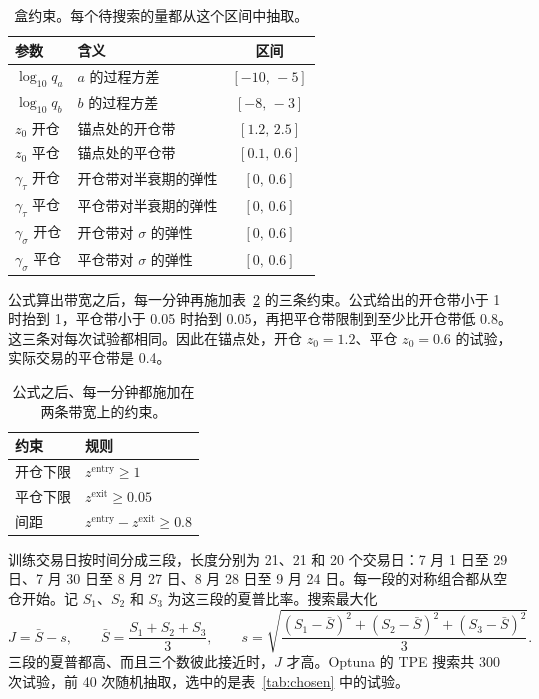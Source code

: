 \documentclass[11pt,fontset=none,scheme=plain]{ctexart}
\begin{document}
\begin{table}[ht]
\centering
\caption{盒约束。每个待搜索的量都从这个区间中抽取。}
\label{tab:search}
\begin{tabular}{llc}
\toprule
参数 & 含义 & 区间 \\
\midrule
$\log_{10} q_a$ & $a$ 的过程方差 & $[-10,\,-5]$ \\
$\log_{10} q_b$ & $b$ 的过程方差 & $[-8,\,-3]$ \\
$z_0$ 开仓 & 锚点处的开仓带 & $[1.2,\,2.5]$ \\
$z_0$ 平仓 & 锚点处的平仓带 & $[0.1,\,0.6]$ \\
$\gamma_\tau$ 开仓 & 开仓带对半衰期的弹性 & $[0,\,0.6]$ \\
$\gamma_\tau$ 平仓 & 平仓带对半衰期的弹性 & $[0,\,0.6]$ \\
$\gamma_\sigma$ 开仓 & 开仓带对 $\sigma$ 的弹性 & $[0,\,0.6]$ \\
$\gamma_\sigma$ 平仓 & 平仓带对 $\sigma$ 的弹性 & $[0,\,0.6]$ \\
\bottomrule
\end{tabular}
\end{table}

公式算出带宽之后，每一分钟再施加表~\ref{tab:bounds} 的三条约束。公式给出的开仓带小于 1 时抬到 1，平仓带小于 0.05 时抬到 0.05，再把平仓带限制到至少比开仓带低 0.8。这三条对每次试验都相同。因此在锚点处，开仓 $z_0 = 1.2$、平仓 $z_0 = 0.6$ 的试验，实际交易的平仓带是 0.4。

\begin{table}[ht]
\centering
\caption{公式之后、每一分钟都施加在两条带宽上的约束。}
\label{tab:bounds}
\begin{tabular}{ll}
\toprule
约束 & 规则 \\
\midrule
开仓下限 & $z^{\mathrm{entry}} \ge 1$ \\
平仓下限 & $z^{\mathrm{exit}} \ge 0.05$ \\
间距 & $z^{\mathrm{entry}} - z^{\mathrm{exit}} \ge 0.8$ \\
\bottomrule
\end{tabular}
\end{table}

训练交易日按时间分成三段，长度分别为 21、21 和 20 个交易日：7 月 1 日至 29 日、7 月 30 日至 8 月 27 日、8 月 28 日至 9 月 24 日。每一段的对称组合都从空仓开始。记 $S_1$、$S_2$ 和 $S_3$ 为这三段的夏普比率。搜索最大化
\begin{equation}
J = \bar S - s,
\qquad
\bar S = \frac{S_1 + S_2 + S_3}{3},
\qquad
s = \sqrt{\frac{(S_1 - \bar S)^2 + (S_2 - \bar S)^2 + (S_3 - \bar S)^2}{3}}.
\end{equation}
三段的夏普都高、而且三个数彼此接近时，$J$ 才高。Optuna 的 TPE 搜索共 300 次试验，前 40 次随机抽取，选中的是表~\ref{tab:chosen} 中的试验。
\end{document}
